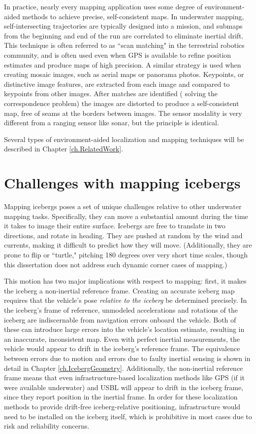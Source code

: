 In practice, nearly every mapping application uses some degree of environment-aided methods to achieve precise, self-consistent maps. In underwater mapping, self-intersecting trajectories are typically designed into a mission, and submaps from the beginning and end of the run are correlated to eliminate inertial drift. This technique is often referred to as ``scan matching" in the terrestrial robotics community, and is often used even when GPS is available to refine position estimates and produce maps of high precision. A similar strategy is used when creating mosaic images, such as aerial maps or panorama photos.  Keypoints, or distinctive image features, are extracted from each image and compared to keypoints from other images. After matches are identified ( solving the correspondence problem) the images are distorted to produce a self-consistent map, free of seams at the borders between images. The sensor modality is very different from a ranging sensor like sonar, but the principle is identical. 

Several types of environment-aided localization and mapping techniques will be described in Chapter \ref{ch.RelatedWork}.

\section{Challenges with mapping icebergs}

Mapping icebergs poses a set of unique challenges relative to other underwater mapping tasks. Specifically, they can move a substantial amount during the time it takes to image their entire surface. Icebergs are free to translate in two directions, and rotate in heading. They are pushed at random by the wind  and currents, making it difficult to predict how they will move. (Additionally, they are prone to flip or ``turtle," pitching 180 degrees over very short time scales, though this dissertation does not address such dynamic corner cases of mapping.) 

This motion has two major implications with respect to mapping: first, it makes the iceberg a non-inertial reference frame. Creating an accurate iceberg map requires that the vehicle's pose \emph{relative to the iceberg} be determined precisely. In the iceberg's frame of reference, unmodeled accelerations and rotations of the iceberg are indiscernable from navigation errors onboard the vehicle. Both of these can introduce large errors into the vehicle's location estimate, resulting in an inaccurate, inconsistent map. Even with perfect inertial measurements, the vehicle would appear to drift in the iceberg's reference frame. The equivalence between errors due to motion and errors due to faulty inertial sensing is shown in detail in Chapter \ref{ch.IcebergGeometry}. Additionally, the non-inertial reference frame means that even infrastructure-based localization methods like GPS (if it were available underwater) and USBL will appear to drift in the iceberg frame, since they report position in the inertial frame. In order for these localization methods to provide drift-free iceberg-relative positioning, infrastructure would need to be installed on the iceberg itself, which is prohibitive in most cases due to risk and reliability concerns. 

